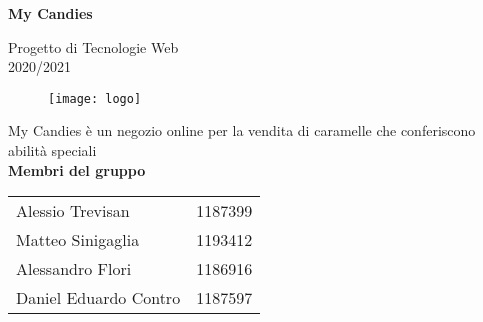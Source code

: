 \begin{titlepage}
   \begin{center}
        \vspace*{1cm}
    
        \vspace{0.3cm}
        \textbf{\huge My Candies}

        \vspace{0.3cm}
        Progetto di Tecnologie Web \\
        \vspace{0.3cm}
        2020/2021
        \vspace{0.3cm}
        \begin{figure}[H]
        \centering
        \texttt{[image: logo]}
        \end{figure}
        \vspace{0.3cm}
         My Candies è un negozio online per la vendita di caramelle che conferiscono abilità speciali \\
        \vspace{1.0cm}
        \textbf{Membri del gruppo} \\
        \vspace{1.0cm}
        \begin{tabular}{lc}
        Alessio Trevisan      & 1187399 \\
        Matteo Sinigaglia     & 1193412 \\
        Alessandro Flori      & 1186916 \\
        Daniel Eduardo Contro & 1187597 \\
        \end{tabular} 
        \\
        \vspace{1.0cm}
        

\end{center}
\end{titlepage}
